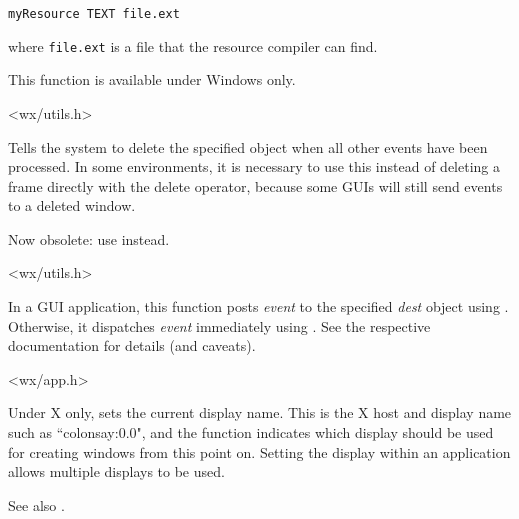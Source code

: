 \begin{verbatim}
myResource TEXT file.ext
\end{verbatim}

where {\tt file.ext} is a file that the resource compiler can find.

This function is available under Windows only.


<wx/utils.h>


\label{wxpostdelete}


Tells the system to delete the specified object when
all other events have been processed. In some environments, it is
necessary to use this instead of deleting a frame directly with the
delete operator, because some GUIs will still send events to a deleted window.

Now obsolete: use  instead.


<wx/utils.h>


\label{wxpostevent}


In a GUI application, this function posts {\it event} to the specified {\it dest}
object using .
Otherwise, it dispatches {\it event} immediately using
.
See the respective documentation for details (and caveats).


<wx/app.h>


\label{wxsetdisplayname}


Under X only, sets the current display name. This is the X host and display name such
as ``colonsay:0.0", and the function indicates which display should be used for creating
windows from this point on. Setting the display within an application allows multiple
displays to be used.

See also .


